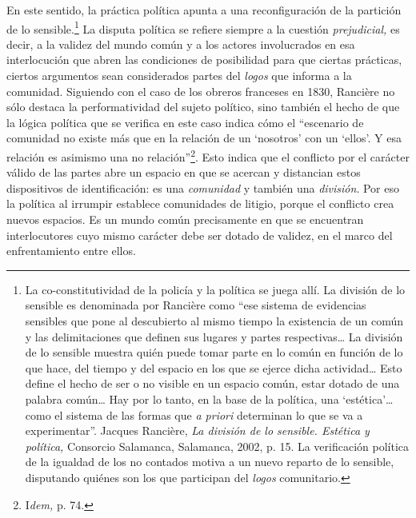 En este sentido, la práctica política apunta a una reconfiguración de la partición de lo sensible.\footnote{La co-constitutividad de la policía y la política se juega allí. La división de lo sensible es denominada por Rancière como \enquote{ese sistema de evidencias sensibles que pone al descubierto al mismo tiempo la existencia de un común y las delimitaciones que definen sus lugares y partes respectivas\ldots{} La división de lo sensible muestra quién puede tomar parte en lo común en función de lo que hace, del tiempo y del espacio en los que se ejerce dicha actividad\ldots{} Esto define el hecho de ser o no visible en un espacio común, estar dotado de una palabra común\ldots{} Hay por lo tanto, en la base de la política, una \enquote{estética}\ldots{} como el sistema de las formas que \emph{a priori} determinan lo que se va a experimentar}. Jacques Rancière, \emph{La división de lo sensible. Estética y política,} Consorcio Salamanca, Salamanca, 2002, p. 15. La verificación política de la igualdad de los no contados motiva a un nuevo reparto de lo sensible, disputando quiénes son los que participan del \emph{logos} comunitario.} La disputa política se refiere siempre a la cuestión \emph{prejudicial,} es decir, a la validez del mundo común y a los actores involucrados en esa interlocución que abren las condiciones de posibilidad para que ciertas prácticas, ciertos argumentos sean considerados partes del \emph{logos} que informa a la comunidad. Siguiendo con el caso de los obreros franceses en 1830, Rancière no sólo destaca la performatividad del sujeto político, sino también el hecho de que la lógica política que se verifica en este caso indica cómo el \enquote{escenario de comunidad no existe más que en la relación de un \enquote{nosotros} con un \enquote{ellos}. Y esa relación es asimismo una no relación}\footnote{I\emph{dem,} p. 74.}. Esto indica que el conflicto por el carácter válido de las partes abre un espacio en que se acercan y distancian estos dispositivos de identificación: es una \emph{comunidad} y también una \emph{división}. Por eso la política al irrumpir establece comunidades de litigio, porque el conflicto crea nuevos espacios. Es un mundo común precisamente en que se encuentran interlocutores cuyo mismo carácter debe ser dotado de validez, en el marco del enfrentamiento entre ellos.

